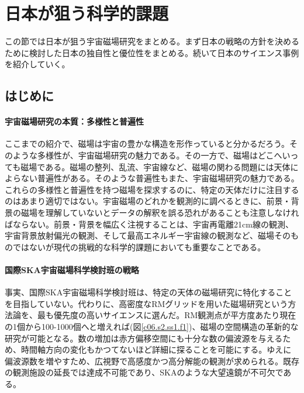 \newpage
\setcounter{section}{2}\section{日本が狙う科学的課題}
\label{c06.s3}

この節では日本が狙う宇宙磁場研究をまとめる。まず日本の戦略の方針を決めるために検討した日本の独自性と優位性をまとめる。続いて日本のサイエンス事例を紹介していく。

\subsection{はじめに}
\label{c06.s3.ss1}

\paragraph{宇宙磁場研究の本質：多様性と普遍性}

ここまでの紹介で、磁場は宇宙の豊かな構造を形作っていると分かるだろう。そのような多様性が、宇宙磁場研究の魅力である。その一方で、磁場はどこへいっても磁場である。磁場の整列、乱流、宇宙線など、磁場の関わる問題には天体によらない普遍性がある。そのような普遍性もまた、宇宙磁場研究の魅力である。これらの多様性と普遍性を持つ磁場を探求するのに、特定の天体だけに注目するのはあまり適切ではない。宇宙磁場のどれかを観測的に調べるときに、前景・背景の磁場を理解していないとデータの解釈を誤る恐れがあることも注意しなければならない。前景・背景を幅広く注視することは、宇宙再電離21cm線の観測、宇宙背景放射偏光の観測、そして最高エネルギー宇宙線の観測など、磁場そのものではないが現代の挑戦的な科学的課題においても重要なことである。

\paragraph{国際SKA宇宙磁場科学検討班の戦略}

事実、国際SKA宇宙磁場科学検討班は、特定の天体の磁場研究に特化することを目指していない。代わりに、高密度なRMグリッドを用いた磁場研究という方法論を、最も優先度の高いサイエンスに選んだ。RM観測点が平方度あたり現在の1個から100-1000個へと増えれば(図\ref{c06.s2.ss1.f1})、磁場の空間構造の革新的な研究が可能となる。数の増加は赤方偏移空間にも十分な数の偏波源を与えるため、時間軸方向の変化もかつてないほど詳細に探ることを可能にする。ゆえに偏波源数を増やすため、広視野で高感度かつ高分解能の観測が求められる。既存の観測施設の延長では達成不可能であり、SKAのような大望遠鏡が不可欠である。

